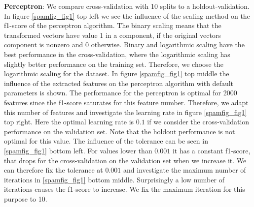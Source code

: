 \documentclass[11pt]{article}
\begin{document}
\textbf{Perceptron}: We compare cross-validation with 10 splits to a holdout-validation. In figure \ref{spamfig_fig1} top left we see the influence of the scaling method on the f1-score of the perceptron algorithm. The binary scaling means that the transformed vectors have value 1 in a component, if the original vectors component is nonzero and 0 otherwise. Binary and logarithmic scaling have the best performance in the cross-validation, where the logarithmic scaling has slightly better performance on the training set. Therefore, we choose the logarithmic scaling for the dataset. In figure \ref{spamfig_fig1} top middle the influence of the extracted features on the perceptron algorithm with default parameters is shown. The performance for the perceptron is optimal for 2000 features since the f1-score saturates for this feature number. Therefore, we adapt this number of features and investigate the learning rate in figure \ref{spamfig_fig1} top right. Here the optimal learning rate is $0.1$ if we consider the cross-validation performance on the validation set. Note that the holdout performance is not optimal for this value. The influence of the tolerance can be seen in \ref{spamfig_fig1} bottom left. For values lower than $0.001$ it has a constant f1-score, that drops for the cross-validation on the validation set when we increase it. We can therefore fix the tolerance at $0.001$ and investigate the maximum number of iterations in \ref{spamfig_fig1} bottom middle. Surprisingly a low number of iterations causes the f1-score to increase. We fix the maximum iteration for this purpose to 10.
\end{document}
